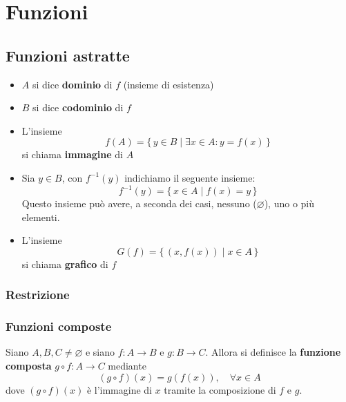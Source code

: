 \chapter{Funzioni}

\section{Funzioni astratte}


\begin{itemize}
    \item $A$ si dice \textbf{dominio} di $f$ (insieme di esistenza)
    \item $B$ si dice \textbf{codominio} di $f$
    \item L'insieme
    \[
    f(A) = \{\, y \in B \mid \exists x \in A : y = f(x) \,\}
    \]
    si chiama \textbf{immagine} di $A$
    \item Sia $y \in B$, con $f^{-1}(y)$ indichiamo il seguente insieme:
    \[
    f^{-1}(y) = \{\, x \in A \mid f(x) = y \,\}
    \]
    Questo insieme può avere, a seconda dei casi, nessuno ($\varnothing$), uno o più elementi.
    \item L'insieme
    \[
    G(f) = \{\, (x, f(x)) \mid x \in A \,\}
    \]
    si chiama \textbf{grafico} di $f$
\end{itemize}

\subsection{Restrizione}


\subsection{Funzioni composte}
Siano $A, B, C \ne \varnothing$ e siano $f: A \to B$ e $g: B \to C$.
Allora si definisce la \textbf{funzione composta} $g \circ f: A \to C$ mediante
\[
(g \circ f)(x) = g(f(x)), \quad \forall x \in A
\]
dove $(g \circ f)(x)$ è l'immagine di $x$ tramite la composizione di $f$ e $g$.

